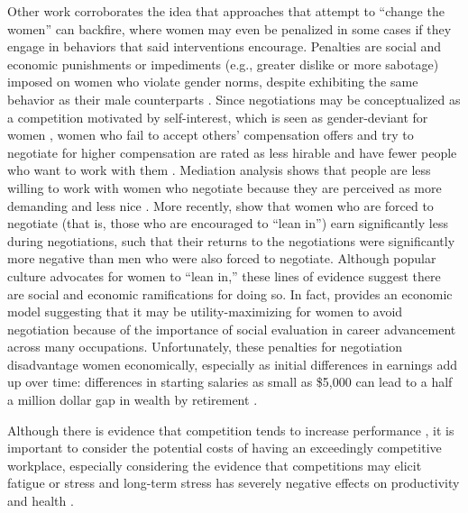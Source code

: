 \documentclass[a4paper, nobind]{templates/ociamthesis}
\begin{document}
Other work corroborates the idea that approaches that attempt to ``change the women'' can backfire, where women may even be penalized in some cases if they engage in behaviors that said interventions encourage. Penalties are social and economic punishments or impediments (e.g., greater dislike or more sabotage) imposed on women who violate gender norms, despite exhibiting the same behavior as their male counterparts \autocite[also known as backlash, see][ for review]{Rudman2012a}. Since negotiations may be conceptualized as a competition motivated by self-interest, which is seen as gender-deviant for women \autocite{Amanatullah2010}, women who fail to accept others' compensation offers and try to negotiate for higher compensation are rated as less hirable and have fewer people who want to work with them \autocite{Bowles2007}. Mediation analysis shows that people are less willing to work with women who negotiate because they are perceived as more demanding and less nice \autocite{Bowles2007}. More recently, \textcite{Exley2020} show that women who are forced to negotiate (that is, those who are encouraged to ``lean in'') earn significantly less during negotiations, such that their returns to the negotiations were significantly more negative than men who were also forced to negotiate. Although popular culture advocates for women to ``lean in,'' these lines of evidence suggest there are social and economic ramifications for doing so. In fact, \textcite{Babcock2012} provides an economic model suggesting that it may be utility-maximizing for women to avoid negotiation because of the importance of social evaluation in career advancement across many occupations. Unfortunately, these penalties for negotiation disadvantage women economically, especially as initial differences in earnings add up over time: differences in starting salaries as small as \$5,000 can lead to a half a million dollar gap in wealth by retirement \autocite{Babcock2009}.

Although there is evidence that competition tends to increase performance \autocite{Connelly2014a,Murayama2012,Miller2019a}, it is important to consider the potential costs of having an exceedingly competitive workplace, especially considering the evidence that competitions may elicit fatigue or stress \autocite{Ryvkin2011,Zhong2018,Buckert2017} and long-term stress has severely negative effects on productivity and health \autocite{Dhabhar2014,Wallace2009,Isham2021}.
\end{document}
